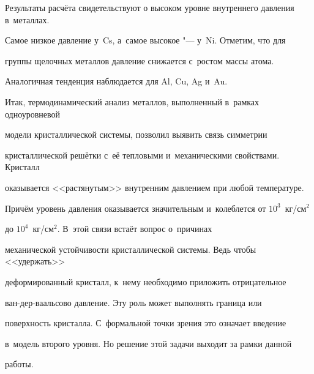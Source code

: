Результаты расчёта свидетельствуют о высоком уровне внутреннего давления в~металлах. 

Самое низкое давление у~Cs, а~самое высокое "--- у~Ni. Отметим, что для 

группы щелочных металлов давление снижается с~ростом массы атома. 

Аналогичная тенденция наблюдается для Al, Cu, Ag и~Au.




Итак, термодинамический анализ металлов, выполненный в~рамках одноуровневой 

модели кристаллической системы, позволил выявить связь симметрии 

кристаллической решётки с~её тепловыми и~механическими свойствами. Кристалл 

оказывается <<растянутым>> внутренним давлением при любой температуре. 

Причём уровень давления оказывается значительным и~колеблется от $10^3$~кг/см$^2$ 

до $10^4$~кг/см$^2$. В~этой связи встаёт вопрос о~причинах 

механической устойчивости кристаллической системы. Ведь чтобы <<удержать>>

деформированный кристалл, к~нему необходимо приложить отрицательное 

ван-дер-ваальсово давление. Эту роль может выполнять граница или 

поверхность кристалла. С~формальной точки зрения это означает введение 

в~модель второго уровня. Но решение этой задачи выходит за рамки данной 

работы.




